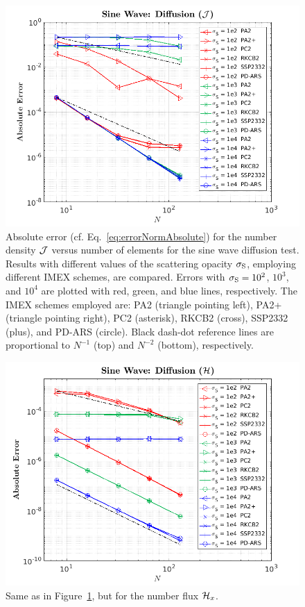 \begin{figure}[H]
  \centering
  \includegraphics[width=1.0\textwidth]{figures/SineWaveDiffusionN}
   \caption{Absolute error (cf. Eq.~\eqref{eq:errorNormAbsolute}) for the number density $\mathcal{J}$ versus number of elements for the sine wave diffusion test.  Results with different values of the scattering opacity $\sigma_{{\rm S}}$, employing different IMEX schemes, are compared.  Errors with $\sigma_{{\rm S}}=10^{2}$, $10^{3}$, and $10^{4}$ are plotted with red, green, and blue lines, respectively.  The IMEX schemes employed are: PA2 (triangle pointing left), PA2+ (triangle pointing right), PC2 (asterisk), RKCB2 (cross), SSP2332 (plus), and PD-ARS (circle).  Black dash-dot reference lines are proportional to $N^{-1}$ (top) and $N^{-2}$ (bottom), respectively.}
  \label{fig:SineWaveDiffusionJ}
\end{figure}

\begin{figure}[H]
  \centering
  \includegraphics[width=1.0\textwidth]{figures/SineWaveDiffusionG}
   \caption{Same as in Figure~\ref{fig:SineWaveDiffusionJ}, but for the number flux $\mathcal{H}_{x}$.}
  \label{fig:SineWaveDiffusionH}
\end{figure}

